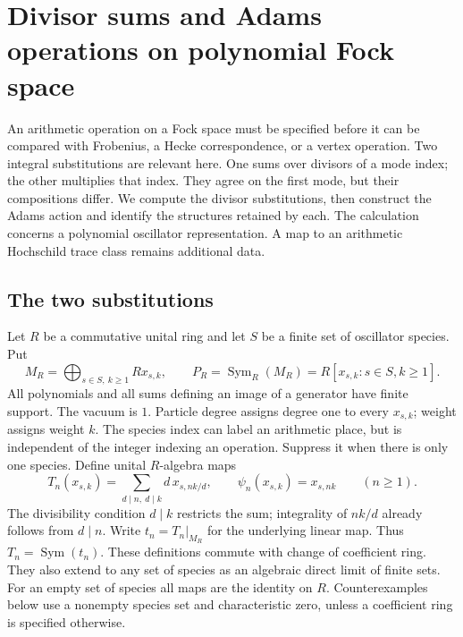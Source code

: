 \chapter{Divisor sums and Adams operations on polynomial Fock space}
\label{v4-arith:ado:chapter}
\label{v4-arith:gelfand-borger}

An arithmetic operation on a Fock space must be specified before it can
be compared with Frobenius, a Hecke correspondence, or a vertex operation.
Two integral substitutions are relevant here. One sums over divisors of a
mode index; the other multiplies that index. They agree on the first mode,
but their compositions differ. We compute the divisor substitutions, then
construct the Adams action and identify the structures retained by each.
The calculation concerns a polynomial oscillator representation. A map to
an arithmetic Hochschild trace class remains additional data.

\section{The two substitutions}
\label{v4-arith:ado:carriers}

Let \(R\) be a commutative unital ring and let \(S\) be a finite set of
oscillator species. Put
\[
 M_R=\bigoplus_{s\in S,\ k\ge1}R x_{s,k},\qquad
 P_R=\operatorname{Sym}_R(M_R)=R[x_{s,k}:s\in S,k\ge1].
\]
All polynomials and all sums defining an image of a generator have finite
support. The vacuum is \(1\). Particle degree assigns degree one to every
\(x_{s,k}\); weight assigns weight \(k\). The species index can label an
arithmetic place, but is independent of the integer indexing an operation.
Suppress it when there is only one species. Define unital \(R\)-algebra maps
\begin{equation}
\label{v4-arith:eq:Tn-formula}
 T_n(x_{s,k})=\sum_{d\mid n,\ d\mid k}d\,x_{s,nk/d},
 \qquad \psi_n(x_{s,k})=x_{s,nk}\qquad(n\ge1).
\end{equation}
The divisibility condition \(d\mid k\) restricts the sum; integrality of
\(nk/d\) already follows from \(d\mid n\). Write \(t_n=T_n|_{M_R}\)
for the underlying linear map. Thus \(T_n=\operatorname{Sym}(t_n)\).
These definitions commute with change of coefficient ring. They also
extend to any set of species as an algebraic direct limit of finite sets.
For an empty set of species all maps are the identity on \(R\).
Counterexamples below use a nonempty species set and characteristic zero,
unless a coefficient ring is specified otherwise.

